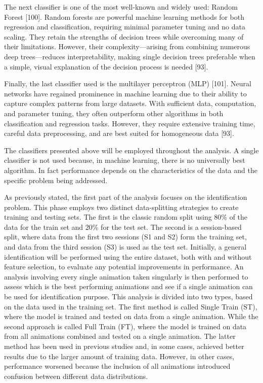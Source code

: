 \documentclass{article}
\begin{document}
The next classifier is one of the most well-known and widely used: Random Forest [100].
Random forests are powerful machine learning methods for both regression and classification, requiring minimal parameter tuning and no data scaling. 
They retain the strengths of decision trees while overcoming many of their limitations. 
However, their complexity—arising from combining numerous deep trees—reduces interpretability, making single decision trees preferable when a simple, visual explanation of the decision process is needed [93].

Finally, the last classifier used is the multilayer perceptron (MLP) [101]. 
Neural networks have regained prominence in machine learning due to their ability to capture complex patterns from large datasets. 
With sufficient data, computation, and parameter tuning, they often outperform other algorithms in both classification and regression tasks. 
However, they require extensive training time, careful data preprocessing, and are best suited for homogeneous data [93]. 

The classifiers presented above will be employed throughout the analysis. 
A single classifier is not used because, in machine learning, there is no universally best algorithm.
In fact performance depends on the characteristics of the data and the specific problem being addressed.

As previously stated, the first part of the analysis focuses on the identification problem. 
This phase employs two distinct data-splitting strategies to create training and testing sets. 
The first is the classic random split using 80\% of the data for the train set and 20\% for the test set.
The second is a session-based split, where data from the first two sessions (S1 and S2) form the training set, and data from the third session (S3) is used as the test set.
Initially, a general identification will be performed using the entire dataset, both with and without feature selection, to evaluate any potential improvements in performance.
An analysis involving every single animation taken singularly is then performed to assess which is the best performing animations and see if a single animation can be used for identification purpose.
This analysis is divided into two types, based on the data used in the training set.
The first method is called Single Train (ST), where the model is trained and tested on data from a single animation.
While the second approach is called Full Train (FT), where the model is trained on data from all animations combined and tested on a single animation.
The latter method has been used in previous studies and, in some cases, achieved better results due to the larger amount of training data. 
However, in other cases, performance worsened because the inclusion of all animations introduced confusion between different data distributions.
\end{document}
